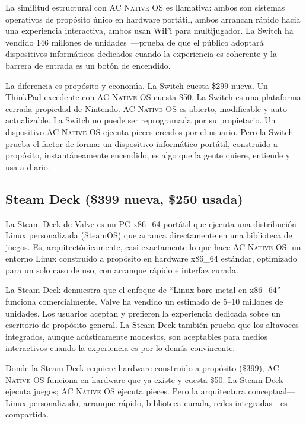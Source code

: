\documentclass[10pt,letterpaper,twocolumn]{article}
\newcommand{\acos}{\textsc{AC Native OS}}
\begin{document}
La similitud estructural con \acos{} es llamativa: ambos son sistemas operativos de prop\'{o}sito \'{u}nico en hardware port\'{a}til, ambos arrancan r\'{a}pido hacia una experiencia interactiva, ambos usan WiFi para multijugador. La Switch ha vendido 146 millones de unidades~\citep{nintendo2024earnings}---prueba de que el p\'{u}blico adoptar\'{a} dispositivos inform\'{a}ticos dedicados cuando la experiencia es coherente y la barrera de entrada es un bot\'{o}n de encendido.

La diferencia es prop\'{o}sito y econom\'{\i}a. La Switch cuesta \$299 nueva. Un ThinkPad excedente con \acos{} cuesta \$50. La Switch es una plataforma cerrada propiedad de Nintendo. \acos{} es abierto, modificable y auto-actualizable. La Switch no puede ser reprogramada por su propietario. Un dispositivo \acos{} ejecuta pieces creados por el usuario. Pero la Switch prueba el factor de forma: un dispositivo inform\'{a}tico port\'{a}til, construido a prop\'{o}sito, instant\'{a}neamente encendido, es algo que la gente quiere, entiende y usa a diario.

\subsection{Steam Deck (\$399 nueva, \$250 usada)}

La Steam Deck de Valve es un PC x86\_64 port\'{a}til que ejecuta una distribuci\'{o}n Linux personalizada (SteamOS) que arranca directamente en una biblioteca de juegos. Es, arquitect\'{o}nicamente, casi exactamente lo que hace \acos{}: un entorno Linux construido a prop\'{o}sito en hardware x86\_64 est\'{a}ndar, optimizado para un solo caso de uso, con arranque r\'{a}pido e interfaz curada.

La Steam Deck demuestra que el enfoque de ``Linux bare-metal en x86\_64'' funciona comercialmente. Valve ha vendido un estimado de 5--10 millones de unidades. Los usuarios aceptan y prefieren la experiencia dedicada sobre un escritorio de prop\'{o}sito general. La Steam Deck tambi\'{e}n prueba que los altavoces integrados, aunque ac\'{u}sticamente modestos, son aceptables para medios interactivos cuando la experiencia es por lo dem\'{a}s convincente.

Donde la Steam Deck requiere hardware construido a prop\'{o}sito (\$399), \acos{} funciona en hardware que ya existe y cuesta \$50. La Steam Deck ejecuta juegos; \acos{} ejecuta pieces. Pero la arquitectura conceptual---Linux personalizado, arranque r\'{a}pido, biblioteca curada, redes integradas---es compartida.
\end{document}

